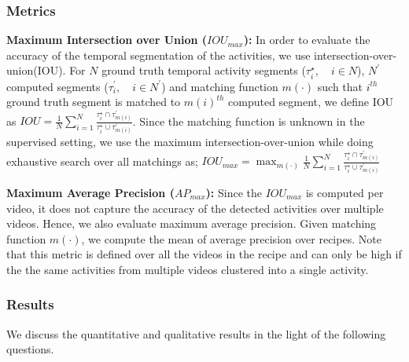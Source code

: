 \subsubsection{Metrics}
\noindent\textbf{Maximum Intersection over Union ($IOU_{max}$):}
In order to evaluate the accuracy of the temporal segmentation of the activities, we use intersection-over-union(IOU). For $N$ ground truth temporal activity segments ($\tau^\star_{i},\quad i\in N$), $N^\prime$ computed segments ($\tau^\prime_{i},\quad i\in N^\prime$) and matching function $m(\cdot)$ such that $i^{th}$ ground truth segment is matched to $m(i)^{th}$ computed segment, we define IOU as \mbox{$IOU=\frac{1}{N}\sum_{i=1}^N \frac{\tau^\star_i \cap \tau^\prime_{m(i)}}{\tau^\star_i \cup \tau^\prime_{m(i)}}$}. Since the matching function is unknown in the supervised setting, we use the maximum intersection-over-union while doing exhaustive search over all matchings as;
\mbox{$IOU_{max} = \max_{m(\cdot)} \frac{1}{N}\sum_{i=1}^N \frac{\tau^\star_i \cap \tau^\prime_{m(i)}}{\tau^\star_i \cup \tau^\prime_{m(i)}}$}

\noindent\textbf{Maximum Average Precision ($AP_{max}$):}
Since the $IOU_{max}$ is computed per video, it does not capture the accuracy of the detected activities over multiple videos. Hence, we also evaluate maximum average precision. Given matching function $m(\cdot)$, we compute the mean of average precision over recipes. Note that this metric is defined over all the videos in the recipe and can only be high if the the same activities from multiple videos clustered into a single activity. 

\subsubsection{Results}
We discuss the quantitative and qualitative results in the light of the following questions.
